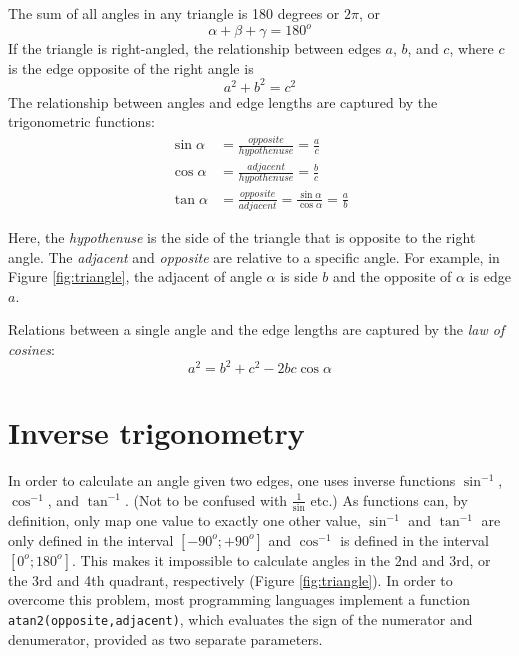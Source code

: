\documentclass[paper=6.14in:9.21in,pagesize=pdftex,11pt,twoside,openright]{scrbook}
\begin{document}
The sum of all angles in any triangle is 180 degrees or $2\pi$, or 
\begin{equation}
\alpha + \beta + \gamma = 180^o
\end{equation}
If the triangle is right-angled, the relationship between edges $a$, $b$, and $c$, where $c$ is the edge opposite of the right angle is
\begin{equation}
a^2+b^2=c^2
\end{equation} 
The relationship between angles and edge lengths are captured by the trigonometric functions:
\begin{eqnarray}
\sin{\alpha}&=\frac{opposite}{hypothenuse}=\frac{a}{c}\\
\cos{\alpha}&=\frac{adjacent}{hypothenuse}=\frac{b}{c}\\
\tan{\alpha}&=\frac{opposite}{adjacent}=\frac{\sin{\alpha}}{\cos{\alpha}}=\frac{a}{b}
\end{eqnarray} 

Here, the \emph{hypothenuse} is the side of the triangle that is opposite to the right angle. The \emph{adjacent} and \emph{opposite} are relative to a specific angle. For example, in Figure \ref{fig:triangle}, the adjacent of angle $\alpha$ is side $b$ and the opposite of $\alpha$ is edge $a$. 

Relations between a single angle and the edge lengths are captured by the \emph{law of cosines}:
\begin{equation}
a^2=b^2+c^2-2bc\cos{\alpha}
\end{equation}

\section{Inverse trigonometry}
In order to calculate an angle given two edges, one uses inverse functions $\sin^{-1}$, $\cos^{-1}$, and $\tan^{-1}$. (Not to be confused with $\frac{1}{\sin}$ etc.) As functions can, by definition, only map one value to exactly one other value, $\sin^{-1}$ and $\tan^{-1}$ are only defined in the interval $[-90^o;+90^o]$ and $\cos^{-1}$ is defined in the interval $[0^o;180^o]$. This makes it impossible to calculate angles in the 2nd and 3rd, or the 3rd and 4th quadrant, respectively (Figure \ref{fig:triangle}). 
In order to overcome this problem, most programming languages implement a function \texttt{atan2(opposite,adjacent)}, which evaluates the sign of the numerator and denumerator, provided as two separate parameters. 
\end{document}
